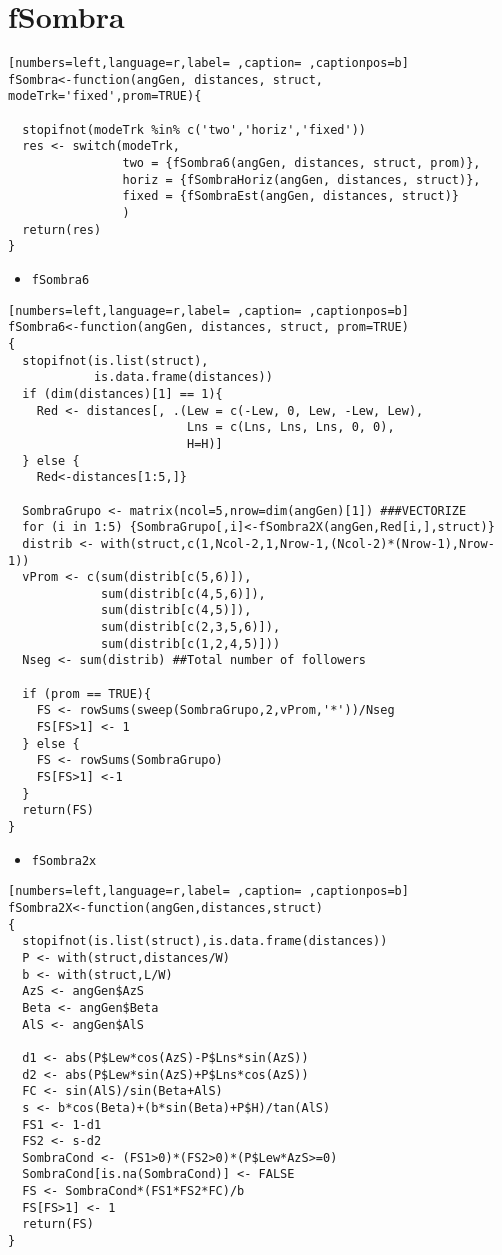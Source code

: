 \section{fSombra}
\label{sec:org6a20171}
\begin{lstlisting}[numbers=left,language=r,label= ,caption= ,captionpos=b]
fSombra<-function(angGen, distances, struct, modeTrk='fixed',prom=TRUE){

  stopifnot(modeTrk %in% c('two','horiz','fixed'))
  res <- switch(modeTrk, 
                two = {fSombra6(angGen, distances, struct, prom)},
                horiz = {fSombraHoriz(angGen, distances, struct)},
                fixed = {fSombraEst(angGen, distances, struct)}
                )
  return(res)
}
\end{lstlisting}
\begin{itemize}
\item \texttt{fSombra6}
\end{itemize}
\begin{lstlisting}[numbers=left,language=r,label= ,caption= ,captionpos=b]
fSombra6<-function(angGen, distances, struct, prom=TRUE)
{
  stopifnot(is.list(struct),
            is.data.frame(distances))
  if (dim(distances)[1] == 1){ 
    Red <- distances[, .(Lew = c(-Lew, 0, Lew, -Lew, Lew),
                         Lns = c(Lns, Lns, Lns, 0, 0),
                         H=H)]
  } else { 
    Red<-distances[1:5,]} 

  SombraGrupo <- matrix(ncol=5,nrow=dim(angGen)[1]) ###VECTORIZE
  for (i in 1:5) {SombraGrupo[,i]<-fSombra2X(angGen,Red[i,],struct)}
  distrib <- with(struct,c(1,Ncol-2,1,Nrow-1,(Ncol-2)*(Nrow-1),Nrow-1)) 
  vProm <- c(sum(distrib[c(5,6)]),
             sum(distrib[c(4,5,6)]),
             sum(distrib[c(4,5)]),
             sum(distrib[c(2,3,5,6)]),
             sum(distrib[c(1,2,4,5)]))
  Nseg <- sum(distrib) ##Total number of followers
  
  if (prom == TRUE){
    FS <- rowSums(sweep(SombraGrupo,2,vProm,'*'))/Nseg
    FS[FS>1] <- 1
  } else {		
    FS <- rowSums(SombraGrupo)
    FS[FS>1] <-1
  }
  return(FS)
}
\end{lstlisting}
\begin{itemize}
\item \texttt{fSombra2x}
\end{itemize}
\begin{lstlisting}[numbers=left,language=r,label= ,caption= ,captionpos=b]
fSombra2X<-function(angGen,distances,struct)
{
  stopifnot(is.list(struct),is.data.frame(distances))
  P <- with(struct,distances/W)
  b <- with(struct,L/W)
  AzS <- angGen$AzS
  Beta <- angGen$Beta
  AlS <- angGen$AlS
  
  d1 <- abs(P$Lew*cos(AzS)-P$Lns*sin(AzS))
  d2 <- abs(P$Lew*sin(AzS)+P$Lns*cos(AzS))
  FC <- sin(AlS)/sin(Beta+AlS)
  s <- b*cos(Beta)+(b*sin(Beta)+P$H)/tan(AlS)
  FS1 <- 1-d1
  FS2 <- s-d2
  SombraCond <- (FS1>0)*(FS2>0)*(P$Lew*AzS>=0)
  SombraCond[is.na(SombraCond)] <- FALSE 
  FS <- SombraCond*(FS1*FS2*FC)/b
  FS[FS>1] <- 1
  return(FS)
}
\end{lstlisting}
